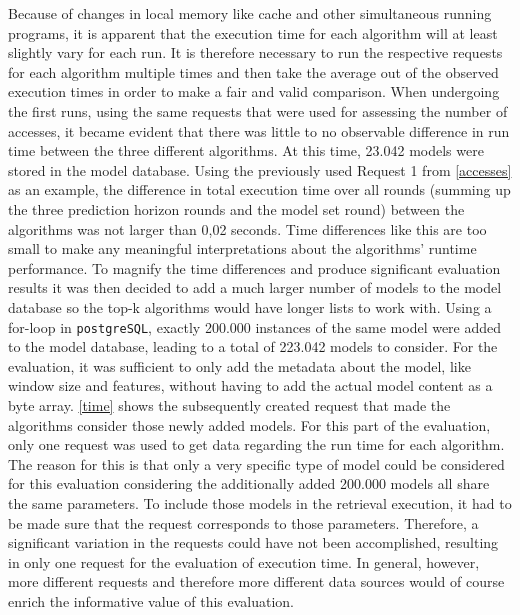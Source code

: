 Because of changes in local memory like cache and other simultaneous running programs, it is apparent that the execution time for each algorithm will at least slightly vary for each run. It is therefore necessary to run the respective requests for each algorithm multiple times and then take the average out of the observed execution times in order to make a fair and valid comparison. When undergoing the first runs, using the same requests that were used for assessing the number of accesses, it became evident that there was little to no observable difference in run time between the three different algorithms. At this time, 23.042 models were stored in the model database. Using the previously used Request 1 from \autoref{accesses} as an example, the difference in total execution time over all rounds (summing up the three prediction horizon rounds and the model set round) between the algorithms was not larger than 0,02 seconds. Time differences like this are too small to make any meaningful interpretations about the algorithms' runtime performance. To magnify the time differences and produce significant evaluation results it was then decided to add a much larger number of models to the model database so the top-k algorithms would have longer lists to work with. Using a for-loop in \texttt{postgreSQL}, exactly 200.000 instances of the same model were added to the model database, leading to a total of 223.042 models to consider. For the evaluation, it was sufficient to only add the metadata about the model, like window size and features, without having to add the actual model content as a byte array. \autoref{time} shows the subsequently created request that made the algorithms consider those newly added models. For this part of the evaluation, only one request was used to get data regarding the run time for each algorithm. The reason for this is that only a very specific type of model could be considered for this evaluation considering the additionally added 200.000 models all share the same parameters. To include those models in the retrieval execution, it had to be made sure that the request corresponds to those parameters. Therefore, a significant variation in the requests could have not been accomplished, resulting in only one request for the evaluation of execution time. In general, however, more different requests and therefore more different data sources would of course enrich the informative value of this evaluation.



